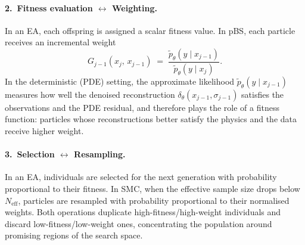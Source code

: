 \paragraph{2.\ Fitness evaluation $\longleftrightarrow$ Weighting.}
In an EA, each offspring is assigned a scalar fitness value. In pBS, each particle
receives an incremental weight
\[
    G_{j-1}(x_j,\, x_{j-1})
    \;=\;
    \frac{\tilde{p}_{\theta}(y \mid x_{j-1})}
         {\tilde{p}_{\theta}(y \mid x_j)}.
\]
In the deterministic (PDE) setting, the approximate likelihood $\tilde{p}_\theta(y \mid
x_{j-1})$ measures how well the denoised reconstruction
$\delta_\theta(x_{j-1}, \sigma_{j-1})$ satisfies the observations and the PDE
residual, and therefore plays the role of a fitness function: particles whose
reconstructions better satisfy the physics and the data receive higher weight.

\paragraph{3.\ Selection $\longleftrightarrow$ Resampling.}
In an EA, individuals are selected for the next generation with probability proportional
to their fitness. In SMC, when the effective sample size drops below $N_{\text{eff}}$,
particles are resampled with probability proportional to their normalised weights. Both
operations duplicate high-fitness/high-weight individuals and discard
low-fitness/low-weight ones, concentrating the population around promising regions of the
search space.




